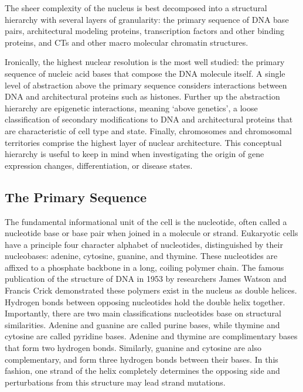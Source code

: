 The sheer complexity of the nucleus is best decomposed into a structural hierarchy with several layers of granularity: the primary
sequence of \gls{DNA} base pairs, architectural modeling proteins, transcription factors and other binding proteins, and \glspl{CT}
and other macro molecular chromatin structures.

Ironically, the highest nuclear resolution is the most well studied: the primary sequence of nucleic acid bases that compose the \gls{DNA}
molecule itself.  A single level of abstraction above the primary sequence considers interactions between \gls{DNA} and  architectural
proteins such as histones.  Further up the abstraction hierarchy are \gls{epigenetic} interactions, meaning `above genetics'\cite{dictepi2014},
a loose classification of secondary modifications to \gls{DNA} and architectural proteins that are characteristic of cell type and state.
Finally, chromosomes and chromosomal territories comprise the highest layer of nuclear architecture.  This conceptual hierarchy is useful
to keep in mind when investigating the origin of gene expression changes, differentiation, or disease states.

\subsection*{The Primary Sequence}

The fundamental informational unit of the cell is the \gls{nucleotide}, often called a nucleotide base or base pair when joined in a
molecule or strand.  Eukaryotic cells have a principle four character alphabet of nucleotides, distinguished by their \glspl{nucleobase}:
adenine, cytosine, guanine, and thymine.  These nucleotides are affixed to a phosphate backbone in a long, coiling polymer chain.  The
famous publication of the structure of \gls{DNA} in 1953 by researchers James Watson and Francis Crick demonstrated these polymers
exist in the nucleus as double helices\cite{watson1953}.  Hydrogen bonds between opposing nucleotides hold the double helix together.
Importantly, there are two main classifications nucleotides base on structural similarities.  Adenine and guanine are called purine bases,
while thymine and cytosine are called pyridine bases.  Adenine and thymine are complimentary bases that form two hydrogen bonds.  Similarly,
guanine and cytosine are also complementary, and form three hydrogen bonds between their bases.  In this fashion, one strand of the helix completely
determines the opposing side and perturbations from this structure may lead strand mutations\cite{cox2008}.

